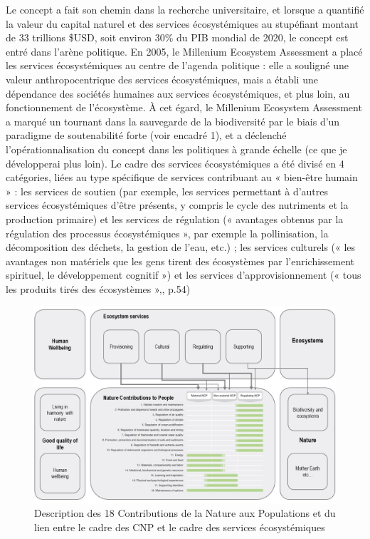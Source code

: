 Le concept a fait son chemin dans la recherche universitaire, et lorsque \cite{Costanza1997} a quantifié la valeur du capital naturel et des services écosystémiques au stupéfiant montant de 33 trillions \$USD, soit environ 30\% du PIB mondial de 2020, le concept est entré dans l'arène politique. En 2005, le Millenium Ecosystem Assessment \citep{MEA2005} a placé les services écosystémiques au centre de l'agenda politique : elle a souligné une valeur anthropocentrique des services écosystémiques, mais a établi une dépendance des sociétés humaines aux services écosystémiques, et plus loin, au fonctionnement de l'écosystème. À cet égard, le Millenium Ecosystem Assessment \citep{MEA2005} a marqué un tournant dans la sauvegarde de la biodiversité par le biais d'un paradigme de soutenabilité forte (voir encadré 1), et a déclenché l'opérationnalisation du concept dans les politiques à grande échelle (ce que je développerai plus loin). Le cadre des services écosystémiques a été divisé en 4 catégories, liées au type spécifique de services contribuant au « bien-être humain » : les services de soutien (par exemple, les services permettant à d'autres services écosystémiques d'être présents, y compris le cycle des nutriments et la production primaire) et les services de régulation (« avantages obtenus par la régulation des processus écosystémiques », par exemple la pollinisation, la décomposition des déchets, la gestion de l'eau, etc.) ; les services culturels (« les avantages non matériels que les gens tirent des écosystèmes par l'enrichissement spirituel, le développement cognitif ») et les services d'approvisionnement (« tous les produits tirés des écosystèmes »,\cite{MEA2005}, p.54)

\begin{figure}[h]
	\centering
	\includegraphics[width = \textwidth]{figures/intro/NCPs2.jpg}
	\caption{Description des 18 Contributions de la Nature aux Populations et du lien entre le cadre des CNP \citep{ipbes_2022_6417333} et le cadre des services écosystémiques \citep{millennium2005ecosystems}}
\end{figure}

